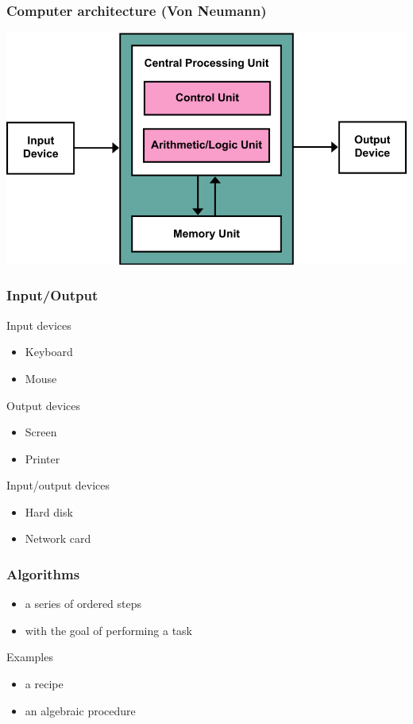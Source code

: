 \begin{frame}
  \frametitle{Computer architecture (Von Neumann)}
  \includegraphics[width=\textwidth]{img/vonNeumannArchitecture.png}
\end{frame}

\begin{frame}
  \frametitle{Input/Output}
  \begin{block}{Input devices}
    \begin{itemize}
    \item Keyboard
    \item Mouse
    \end{itemize}
  \end{block}
  \pause
  \begin{block}{Output devices}
    \begin{itemize}
    \item Screen
    \item Printer
    \end{itemize}
  \end{block}
  \pause
  \begin{block}{Input/output devices}
    \begin{itemize}
    \item Hard disk
    \item Network card
    \end{itemize}
  \end{block}
\end{frame}

\begin{frame}
  \frametitle{Algorithms}
  \begin{itemize}
  \item a series of ordered \alert{steps}
  \item with the goal of performing a \alert{task}
  \end{itemize}
  \pause
  \begin{block}{Examples}
    \begin{itemize}
    \item a recipe
    \item an algebraic procedure
    \end{itemize}
  \end{block}
\end{frame}

